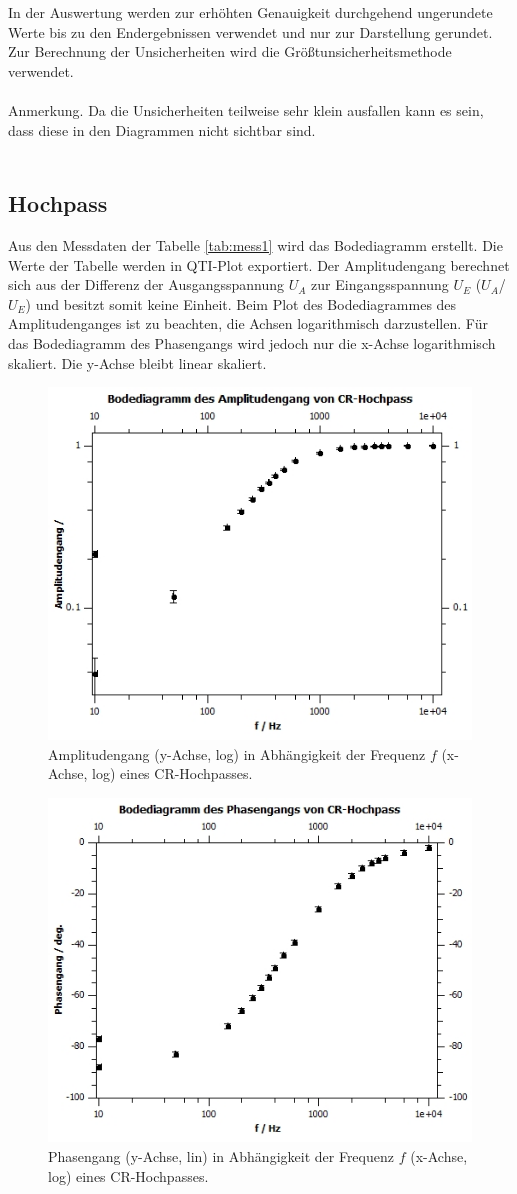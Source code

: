 \documentclass[12pt,a4paper,twoside]{article}
\begin{document}
In der Auswertung werden zur erhöhten Genauigkeit durchgehend ungerundete Werte bis zu den Endergebnissen verwendet und nur zur Darstellung gerundet. \\
Zur Berechnung der Unsicherheiten wird die Größtunsicherheitsmethode verwendet.
\\
\\
Anmerkung. Da die Unsicherheiten teilweise sehr klein ausfallen kann es sein, dass diese in den Diagrammen nicht sichtbar sind. 
\\
\\
\subsection{Hochpass}
Aus den Messdaten der Tabelle \ref{tab:mess1} wird das Bodediagramm erstellt. 
Die Werte der Tabelle werden in QTI-Plot exportiert. 
Der Amplitudengang berechnet sich aus der Differenz der Ausgangsspannung $U_A$ zur Eingangsspannung $U_E$ ($U_A$/$U_E$) und besitzt somit keine Einheit. 
Beim Plot des Bodediagrammes des Amplitudenganges ist zu beachten, die Achsen logarithmisch darzustellen. 
Für das Bodediagramm des Phasengangs wird jedoch nur die x-Achse logarithmisch skaliert. Die y-Achse bleibt linear skaliert. 

\begin{figure}[H]
    \centering
    \includegraphics[width=0.6\linewidth]{nudes/Plot a1 amp.jpg}
    \caption{Amplitudengang (y-Achse, log) in Abhängigkeit der Frequenz $f$ (x-Achse, log) eines CR-Hochpasses. }
    \label{fig:plot a1 amp} 
\end{figure}

\begin{figure}[H]
    \centering
    \includegraphics[width=0.6\linewidth]{nudes/Plot a1 ph.jpg}
    \caption{Phasengang (y-Achse, lin) in Abhängigkeit der Frequenz $f$ (x-Achse, log) eines CR-Hochpasses. }
    \label{fig:plot a1 ph} 
\end{figure}
\end{document}

